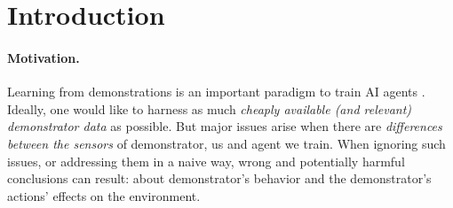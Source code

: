 \documentclass[letterpaper]{article} %
\theoremstyle{definition}%
\theoremstyle{definition}
\newcommand{\todo}[1]{\textcolor{red}{#1}}
\begin{document}
%



\section{Introduction}\label{sec:intro}

%


\paragraph{Motivation.}
Learning from demonstrations is an important paradigm to train AI agents \cite{argall2009survey,schaal1999imitation,ho2016generative,jeon2018bayesian}.
Ideally, one would like to harness as much \emph{cheaply available (and relevant) demonstrator data} as possible. 
But major issues arise when there are \emph{differences between the sensors} of demonstrator, us and agent we train.
When ignoring such issues, or addressing them in a naive way, wrong and potentially harmful conclusions can result: about demonstrator's behavior and the demonstrator's actions' effects on the environment.%
\end{document}
